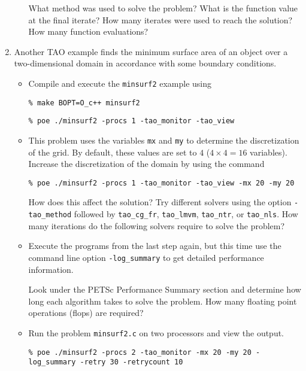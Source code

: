 \documentclass[11pt]{article}
\begin{document}
\begin{enumerate}
\begin{itemize}
  What method was used to solve the problem?
  What is the function value at the final iterate? 
  How many iterates were used to reach the solution?  
  How many function evaluations?

 \newpage

\end{itemize}

\item
Another TAO example finds the minimum surface area of an object over a
two-dimensional domain in accordance with some boundary conditions.

\begin{itemize}

\item
Compile and execute the \texttt{minsurf2} example using
    
\texttt{\% make BOPT=O\_c++ minsurf2}

\texttt{\% poe ./minsurf2 -procs 1 -tao\_monitor -tao\_view}

\item
This problem uses the variables {\tt mx} and {\tt my} to determine
the discretization of the grid.  By default, these values are set to
$4$ ($4 \times 4 = 16$ variables). Increase the discretization of the 
domain by using the command 

\texttt{\% poe ./minsurf2 -procs 1 -tao\_monitor -tao\_view -mx 20 -my 20}

How does this affect the solution?
Try different solvers using the option \texttt{-tao\_method} followed by
\texttt{tao\_cg\_fr},
\texttt{tao\_lmvm}, \texttt{tao\_ntr}, or \texttt{tao\_nls}.
How many iterations do the following solvers require to solve the problem?


\item
Execute the programs from the last step again, but this time use the command line option 
\texttt{-log\_summary} to get detailed performance information.

Look under the PETSc Performance Summary section and determine how long
each algorithm takes to solve the problem. How many floating point operations (flops) are required? 


\item
Run the problem \texttt{minsurf2.c} on two processors and view the output.

\texttt{\% poe ./minsurf2 -procs 2 -tao\_monitor -mx 20 -my 20 -log\_summary -retry 30 -retrycount 10}

\end{itemize}


\end{enumerate}
\end{document}
